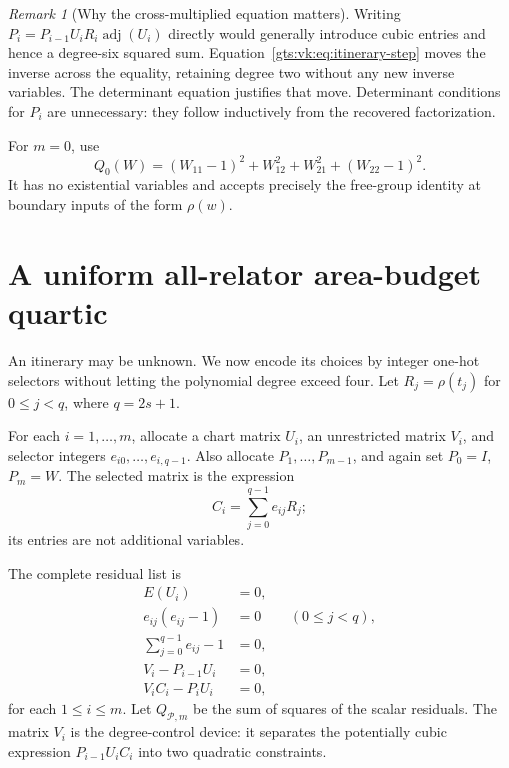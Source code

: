\documentclass[11pt,letterpaper]{article}
\theoremstyle{definition}
\theoremstyle{remark}
\newtheorem{remark}[theorem]{Remark}
\newcommand{\Pp}{\mathcal P}
\newcommand{\adj}{\operatorname{adj}}
\begin{document}
\begin{remark}[Why the cross-multiplied equation matters]
Writing $P_i=P_{i-1}U_iR_i\adj(U_i)$ directly would generally introduce cubic entries and hence a degree-six squared sum. Equation~\eqref{gts:vk:eq:itinerary-step} moves the inverse across the equality, retaining degree two without any new inverse variables. The determinant equation justifies that move. Determinant conditions for $P_i$ are unnecessary: they follow inductively from the recovered factorization.
\end{remark}

For $m=0$, use
\begin{equation}\label{gts:vk:eq:zero-budget}
 Q_0(W)=(W_{11}-1)^2+W_{12}^2+W_{21}^2+(W_{22}-1)^2.
\end{equation}
It has no existential variables and accepts precisely the free-group identity at boundary inputs of the form $\rho(w)$.

\section{A uniform all-relator area-budget quartic}\label{gts:vk:sec:budget}

An itinerary may be unknown. We now encode its choices by integer one-hot selectors without letting the polynomial degree exceed four. Let
$R_j=\rho(t_j)$ for $0\leq j<q$, where $q=2s+1$.

For each $i=1,\ldots,m$, allocate a chart matrix $U_i$, an unrestricted matrix $V_i$, and selector integers $e_{i0},\ldots,e_{i,q-1}$.
Also allocate $P_1,\ldots,P_{m-1}$, and again set $P_0=I$, $P_m=W$.
The selected matrix is the expression
\begin{equation}\label{gts:vk:eq:selected}
 C_i=\sum_{j=0}^{q-1}e_{ij}R_j;
\end{equation}
its entries are not additional variables.

The complete residual list is
\begin{align}
 E(U_i)&=0,\label{gts:vk:eq:budget-det}\\
 e_{ij}(e_{ij}-1)&=0 &&(0\leq j<q),\label{gts:vk:eq:budget-bool}\\
 \sum_{j=0}^{q-1}e_{ij}-1&=0,\label{gts:vk:eq:budget-one}\\
 V_i-P_{i-1}U_i&=0,\label{gts:vk:eq:budget-v}\\
 V_iC_i-P_iU_i&=0,\label{gts:vk:eq:budget-step}
\end{align}
for each $1\leq i\leq m$. Let $Q_{\Pp,m}$ be the sum of squares of the scalar residuals. The matrix $V_i$ is the degree-control device: it separates the potentially cubic expression $P_{i-1}U_iC_i$ into two quadratic constraints.
\end{document}
